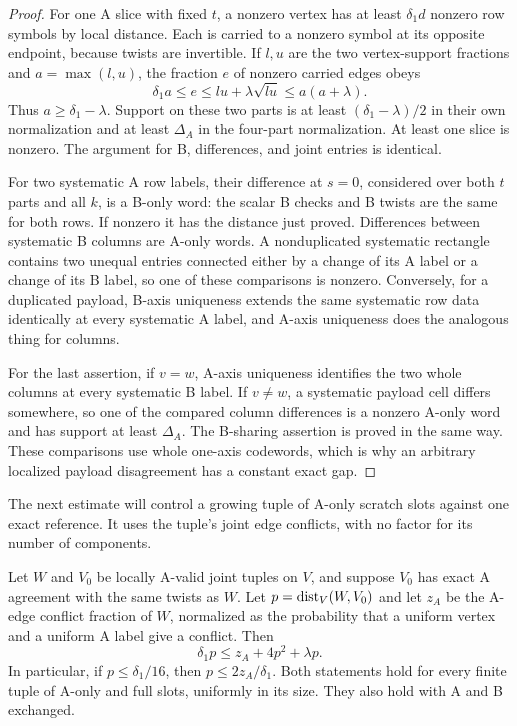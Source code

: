 \begin{proof}
For one A slice with fixed $t$, a nonzero vertex has at least
$\delta_1d$ nonzero row symbols by local distance.  Each is carried
to a nonzero symbol at its opposite endpoint, because twists are
invertible.  If $l,u$ are the two vertex-support fractions and
$a=\max(l,u)$, the fraction $e$ of nonzero carried edges obeys
\[
 \delta_1a\le e\le lu+\lambda\sqrt{lu}\le a(a+\lambda).
\]
Thus $a\ge\delta_1-\lambda$.  Support on these two parts is at
least $(\delta_1-\lambda)/2$ in their own normalization and at least
$\Delta_A$ in the four-part normalization.  At least one slice is
nonzero.  The argument for B, differences, and joint entries is
identical.

For two systematic A row labels, their difference at $s=0$, considered
over both $t$ parts and all $k$, is a B-only word: the scalar B checks
and B twists are the same for both rows.  If nonzero it has the
distance just proved.  Differences between systematic B columns are
A-only words.  A nonduplicated systematic rectangle contains two
unequal entries connected either by a change of its A label or a
change of its B label, so one of these comparisons is nonzero.
Conversely, for a duplicated payload, B-axis uniqueness extends the
same systematic row data identically at every systematic A label,
and A-axis uniqueness does the analogous thing for columns.

For the last assertion, if $v=w$, A-axis uniqueness identifies the
two whole columns at every systematic B label.  If $v\ne w$, a
systematic payload cell differs somewhere, so one of the compared
column differences is a nonzero A-only word and has support at least
$\Delta_A$.  The B-sharing assertion is proved in the same way.
These comparisons use whole one-axis codewords, which is why an
arbitrary localized payload disagreement has a constant exact gap.
\end{proof}

The next estimate will control a growing tuple of A-only scratch
slots against one exact reference.  It uses the tuple's joint edge
conflicts, with no factor for its number of components.

\begin{lemma}\label{oc:near-code}
Let $W$ and $V_0$ be locally A-valid joint tuples on $V$, and suppose
$V_0$ has exact A agreement with the same twists as $W$.  Let
$p=\operatorname{dist}_V(W,V_0)$ and let $z_A$ be the A-edge conflict fraction of
$W$, normalized as the probability that a uniform vertex and a
uniform A label give a conflict.  Then
\begin{equation}\label{oc:near-code-inequality}
 \delta_1p\le z_A+4p^2+\lambda p.
\end{equation}
In particular, if $p\le\delta_1/16$, then
$p\le2z_A/\delta_1$.  Both statements hold for every finite tuple
of A-only and full slots, uniformly in its size.  They also hold
with A and B exchanged.
\end{lemma}


